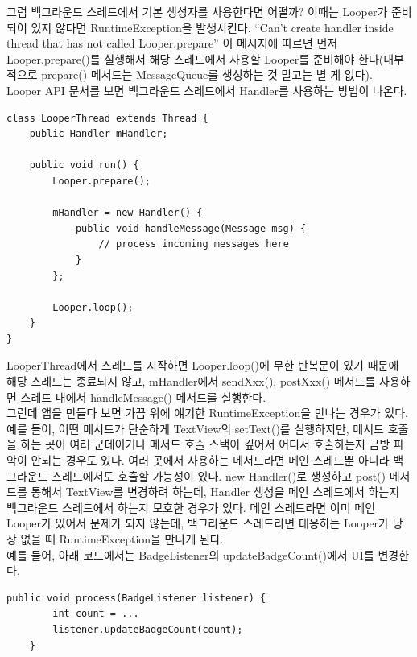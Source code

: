 그럼 백그라운드 스레드에서 기본 생성자를 사용한다면 어떨까? 이때는 Looper가 준비되어 있지 않다면 RuntimeException을 발생시킨다. 
``Can't create handler inside thread that has not called Looper.prepare''
이 메시지에 따르면 먼저 Looper.prepare()를 실행해서 해당 스레드에서 사용할 Looper를 준비해야 한다(내부적으로 prepare() 메서드는 MessageQueue를 생성하는 것 말고는 별 게 없다).\\

Looper API 문서를 보면 백그라운드 스레드에서 Handler를 사용하는 방법이 나온다.

\begin{lstlisting}[frame=single, caption=LooperThead, label=src:LooperThread] 
class LooperThread extends Thread {
	public Handler mHandler;

	public void run() {
		Looper.prepare();

		mHandler = new Handler() {
        	public void handleMessage(Message msg) {
            	// process incoming messages here
			}
		};

		Looper.loop();
	}
}
\end{lstlisting}
LooperThread에서 스레드를 시작하면 Looper.loop()에 무한 반복문이 있기 때문에 해당 스레드는 종료되지 않고, mHandler에서 sendXxx(), postXxx() 메서드를 사용하면 스레드 내에서 handleMessage() 메서드를 실행한다.\\

그런데 앱을 만들다 보면 가끔 위에 얘기한 RuntimeException을 만나는 경우가 있다.
예를 들어, 어떤 메서드가 단순하게 TextView의 setText()를 실행하지만, 메서드 호출을 하는 곳이 여러 군데이거나 메서드 호출 스택이 깊어서 어디서 호출하는지 금방 파악이 안되는 경우도 있다.
여러 곳에서 사용하는 메서드라면 메인 스레드뿐 아니라 백그라운드 스레드에서도 호출할 가능성이 있다. 
new Handler()로 생성하고 post() 메서드를 통해서 TextView를 변경하려 하는데, Handler 생성을 메인 스레드에서 하는지 백그라운드 스레드에서 하는지 모호한 경우가 있다.
메인 스레드라면 이미 메인 Looper가 있어서 문제가 되지 않는데, 백그라운드 스레드라면 대응하는 Looper가 당장 없을 때 RuntimeException을 만나게 된다.\\

예를 들어, 아래 코드에서는 BadgeListener의 updateBadgeCount()에서 UI를 변경한다.
\begin{lstlisting}[frame=single] 
	public void process(BadgeListener listener) {
		int count = ...
		listener.updateBadgeCount(count);
	}
\end{lstlisting}	

